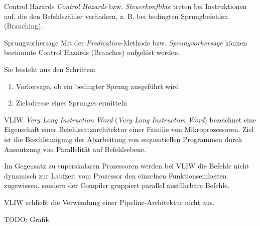 \begin{defi}{Control Hazards}
    \emph{Control Hazards} bzw. \emph{Steuerkonflikte} treten bei Instruktionen auf, die den Befehlszähler verändern, z. B. bei bedingten Sprungbefehlen (Branching).
\end{defi}

\begin{defi}{Sprungvorhersage}
    Mit der \emph{Predication}-Methode bzw. \emph{Sprungvorhersage} können bestimmte Control Hazards (Branches) aufgelöst werden.
    
    Sie besteht aus den Schritten:
    \begin{enumerate}
        \item Vorhersage, ob ein bedingter Sprung ausgeführt wird
        \item Zieladresse eines Sprunges ermitteln
    \end{enumerate}
\end{defi}

\begin{defi}[Befehlssatzarchitektur]{VLIW}
    \emph{Very Long Instruction Word} (\emph{Very Long Instruction Word}) bezeichnet eine Eigenschaft einer Befehlssatzarchitektur einer Familie von Mikroprozessoren.
    Ziel ist die Beschleunigung der Abarbeitung von sequentiellen Programmen durch Ausnutzung von Parallelität auf Befehlsebene.
    
    Im Gegensatz zu superskalaren Prozessoren werden bei VLIW die Befehle nicht dynamisch zur Laufzeit vom Prozessor den einzelnen Funktionseinheiten zugewiesen, sondern der Compiler gruppiert parallel ausführbare Befehle.
    
    VLIW schließt die Verwendung einer Pipeline-Architektur nicht aus.
    
    TODO: Grafik
\end{defi}

